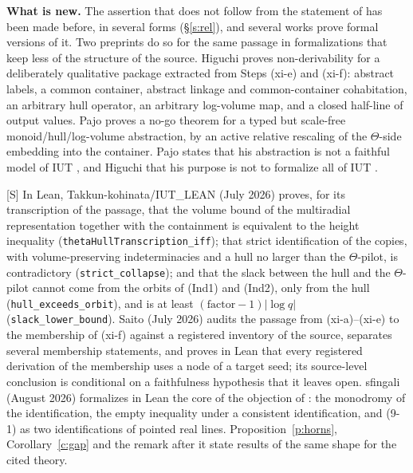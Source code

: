 \documentclass[11pt]{article}
\theoremstyle{plain}
\theoremstyle{definition}
\theoremstyle{remark}
\newcommand{\Smark}{\textup{[S]}}
\begin{document}
\smallskip\noindent\textbf{What is new.} The assertion that
\cite[Cor.~3.12]{IUT3} does not follow from the statement of \cite[Thm.~3.11]{IUT3}
has been made before, in several forms (\S\ref{s:rel}), and several works prove formal
versions of it. Two preprints do so for the same passage in formalizations that keep less
of the structure of the source. Higuchi \cite{Higuchi} proves non-derivability for a deliberately qualitative
package extracted from Steps (xi-e) and (xi-f): abstract labels, a common container,
abstract linkage and common-container cohabitation, an arbitrary hull operator, an
arbitrary log-volume map, and a closed half-line of output values. Pajo \cite{Pajo} proves
a no-go theorem for a typed but scale-free monoid/hull/log-volume abstraction, by an active
relative rescaling of the $\Theta$-side embedding into the container. Pajo states that his
abstraction is not a faithful model of IUT \cite[\S\S2, 14]{Pajo}, and Higuchi that his
purpose is not to formalize all of IUT \cite[\S3]{Higuchi}.

\Smark{} In Lean, Takkun-kohinata/IUT\_LEAN \cite{Takkun} (July 2026) proves, for its
transcription of the passage, that the volume bound of the multiradial representation
together with the containment is equivalent to the height inequality
(\texttt{thetaHullTranscription\_iff}); that strict identification of the copies, with
volume-preserving indeterminacies and a hull no larger than the $\Theta$-pilot, is
contradictory (\texttt{strict\_collapse}); and that the slack between the hull and the
$\Theta$-pilot cannot come from the orbits of (Ind1) and (Ind2), only from the hull
(\texttt{hull\_exceeds\_orbit}), and is at least $(\mathrm{factor}-1)|\log q|$
(\texttt{slack\_lower\_bound}). Saito \cite{Saito} (July 2026) audits the passage from
(xi-a)--(xi-e) to the membership of (xi-f) against a registered inventory of the source,
separates several membership statements, and proves in Lean that every registered
derivation of the membership uses a node of a target seed; its source-level conclusion is
conditional on a faithfulness hypothesis that it leaves open. sfingali \cite{sfingali}
(August 2026) formalizes in Lean the core of the objection of \cite{SS}: the monodromy of
the identification, the empty inequality under a consistent identification, and (9-1) as
two identifications of pointed real lines. Proposition~\ref{p:horns}, Corollary~\ref{c:gap}
and the remark after it state results of the same shape for the cited theory.
\end{document}
